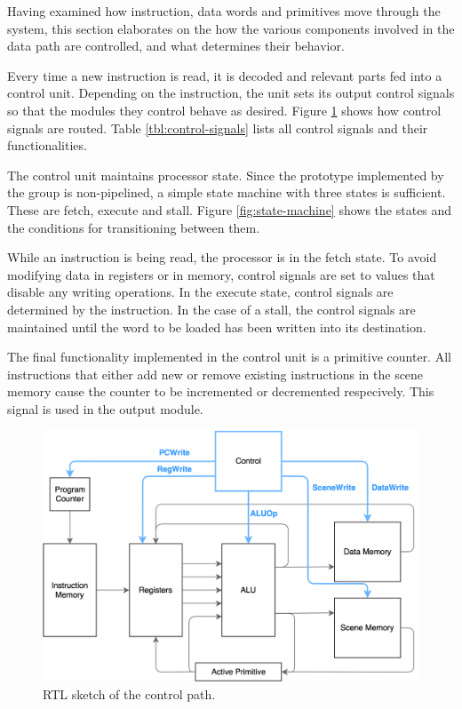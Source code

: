 Having examined how instruction, data words and primitives move through the system, this section elaborates on the how the various components involved in the data path are controlled, and what determines their behavior.

Every time a new instruction is read, it is decoded and relevant parts fed into a control unit.
Depending on the instruction, the unit sets its output control signals so that the modules they control behave as desired.
Figure \ref{fig:controlpath} shows how control signals are routed.
Table \ref{tbl:control-signals} lists all control signals and their functionalities.

The control unit maintains processor state.
Since the prototype implemented by the group is non-pipelined, a simple state machine with three states is sufficient.
These are fetch, execute and stall.
Figure \ref{fig:state-machine} shows the states and the conditions for transitioning between them.

While an instruction is being read, the processor is in the fetch state.
To avoid modifying data in registers or in memory, control signals are set to values that disable any writing operations.
In the execute state, control signals are determined by the instruction.
In the case of a stall, the control signals are maintained until the word to be loaded has been written into its destination.

The final functionality implemented in the control unit is a primitive counter.
All instructions that either add new or remove existing instructions in the scene memory cause the counter to be incremented or decremented respecively.
This signal is used in the output module.

\begin{figure}[h!]
    \includegraphics[width=\linewidth]{images/Control_signals.png}
    \caption{RTL sketch of the control path.}
    \label{fig:controlpath}
\end{figure}

